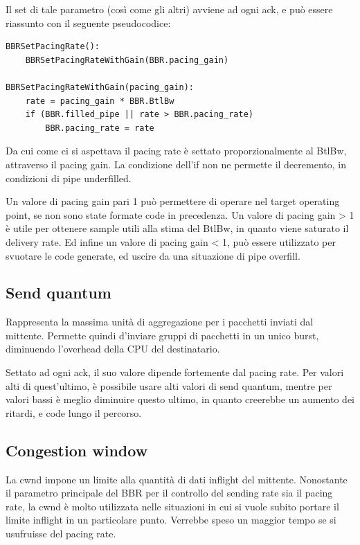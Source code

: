 Il set di tale parametro (così come gli altri) avviene ad ogni ack, e può essere riassunto con il seguente pseudocodice:

\begin{lstlisting}[caption=BBRSetPacingRate]
BBRSetPacingRate():
	BBRSetPacingRateWithGain(BBR.pacing_gain)

BBRSetPacingRateWithGain(pacing_gain):
	rate = pacing_gain * BBR.BtlBw
	if (BBR.filled_pipe || rate > BBR.pacing_rate)
		BBR.pacing_rate = rate

\end{lstlisting}

Da cui come ci si aspettava il pacing rate è settato proporzionalmente al BtlBw, attraverso il pacing gain.
La condizione dell'if non ne permette il decremento, in condizioni di pipe underfilled. \bigskip

Un valore di pacing gain pari 1 può permettere di operare nel target operating point, se non sono state formate code in precedenza. Un valore di pacing gain > 1 è utile per ottenere sample utili alla stima del BtlBw, in quanto viene saturato il delivery rate. Ed infine un valore di pacing gain < 1, può essere utilizzato per svuotare le code generate, ed uscire da una situazione di pipe overfill.

\subsection{Send quantum}

Rappresenta la massima unità di aggregazione per i pacchetti inviati dal mittente. Permette quindi d'inviare gruppi di pacchetti in un unico burst, diminuendo l'overhead della CPU del destinatario. \bigskip

Settato ad ogni ack, il suo valore dipende fortemente dal pacing rate. Per valori alti di quest'ultimo, è possibile usare alti valori di send quantum, mentre per valori bassi è meglio diminuire questo ultimo, in quanto creerebbe un aumento dei ritardi, e code lungo il percorso.

\subsection{Congestion window}

La cwnd impone un limite alla quantità di dati inflight del mittente. Nonostante il parametro principale del BBR per il controllo del sending rate sia il pacing rate, la cwnd è molto utilizzata nelle situazioni in cui si vuole subito portare il limite inflight in un particolare punto. Verrebbe speso un maggior tempo se si usufruisse del pacing rate. \bigskip

